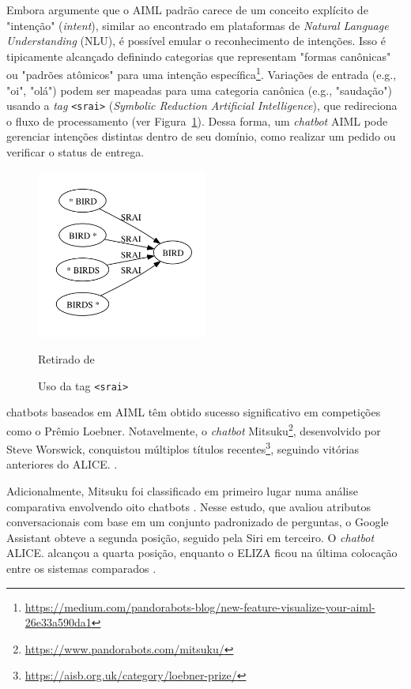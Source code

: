 \documentclass[14pt,a4paper,oneside]{book}
\begin{document}
Embora \cite{Hohn2019} argumente que o AIML padrão carece de um conceito explícito de "intenção" (\emph{intent}), similar ao encontrado em plataformas de \emph{Natural Language Understanding} (NLU), é possível emular o reconhecimento de intenções. Isso é tipicamente alcançado definindo categorias que representam "formas canônicas" ou "padrões atômicos" para uma intenção específica\footnote{\url{https://medium.com/pandorabots-blog/new-feature-visualize-your-aiml-26e33a590da1}}. Variações de entrada (e.g., "oi", "olá") podem ser mapeadas para uma categoria canônica (e.g., "saudação") usando a \emph{tag} \texttt{<srai>} (\emph{Symbolic Reduction Artificial Intelligence}), que redireciona o fluxo de processamento (ver Figura~\ref{fig:sodatagsrai}). Dessa forma, um \emph{chatbot} AIML pode gerenciar intenções distintas dentro de seu domínio, como realizar um pedido ou verificar o status de entrega.

\begin{figure}
    \centering
    \caption{Uso da tag \texttt{<srai>}}
    \includegraphics[width=0.5\textwidth]{./fig/image13} %
    \label{fig:sodatagsrai}
    \vspace{0.2cm} %
    {\footnotesize 
	
	Retirado de \cite{DeGasperis2013}}
\end{figure}

chatbots baseados em AIML têm obtido sucesso significativo em competições como o Prêmio Loebner. Notavelmente, o \emph{chatbot} Mitsuku\footnote{\url{https://www.pandorabots.com/mitsuku/}}, desenvolvido por Steve Worswick, conquistou múltiplos títulos recentes\footnote{\url{https://aisb.org.uk/category/loebner-prize/}}, seguindo vitórias anteriores do ALICE. \cite{Wallace2000}.

Adicionalmente, Mitsuku foi classificado em primeiro lugar numa análise comparativa envolvendo oito chatbots \cite{Sharma2020}. Nesse estudo, que avaliou atributos conversacionais com base em um conjunto padronizado de perguntas, o Google Assistant obteve a segunda posição, seguido pela Siri em terceiro. O \emph{chatbot} ALICE. alcançou a quarta posição, enquanto o ELIZA ficou na última colocação entre os sistemas comparados \cite{Sharma2020}.
\end{document}
